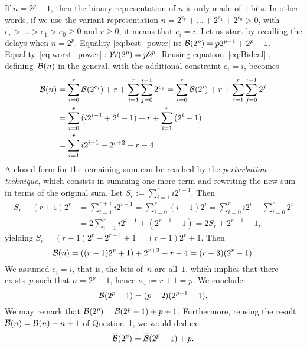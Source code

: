 If \(n=2^p-1\), then the binary representation of \(n\) is only made
of \(1\)\hyp{}bits. In other words, if we use the variant
representation \(n=2^{e_r} + \dots + 2^{e_1} + 2^{e_0} > 0\), with
\(e_r > \dots > e_1 > e_0 \geqslant 0\) and \({r \geqslant 0}\), it
means that \({e_i=i}\). Let us start by recalling the delays when
\({n=2^p}\). Equality \eqref{eq:best_power} 
is: \(\mathcal{B}(2^p) = p2^{p-1} + 2^p -
1\). Equality~\eqref{eq:worst_power} :
\(\mathcal{W}(2^p) = p2^p\). Reusing equation~\eqref{eq:Bideal}
, defining~\(\mathcal{B}(n)\) in the general, with the
additional constraint \({e_i=i}\), becomes
\begin{align*}
\mathcal{B}(n)
  &=   \sum_{i=0}^{r}{\mathcal{B}(2^{e_i})}
     + r + \sum_{i=1}^{r}\sum_{j=0}^{i-1}{2^{e_j}}
   = \sum_{i=0}^{r}{\mathcal{B}(2^i)}
     + r + \sum_{i=1}^{r}\sum_{j=0}^{i-1}{2^j}\\
  &= \sum_{i=0}^{r}{(i2^{i-1} + 2^i - 1)}
     + r + \sum_{i=1}^{r}{(2^i - 1)}\\
  &= \sum_{i=1}^{r}{i2^{i-1}} + 2^{r+2} - r - 4.
\end{align*}
A closed form for the remaining sum can be reached by the
\emph{perturbation technique}, which consists in summing one more term
and rewriting the new sum in terms of the original sum. Let \(S_{r} :=
\sum_{i=1}^{r}{i2^{i-1}}\). Then
\begin{align*}
S_{r} + (r+1)2^r
  &= \sum_{i=1}^{r+1}{i2^{i-1}} = \sum_{i=0}^{r}{(i+1)2^{i}}
   = \sum_{i=0}^{r}{i2^{i}} + \sum_{i=0}^{r}{2^{i}}\\
  &= 2\sum_{i=1}^{r}{i2^{i-1}} + (2^{r+1} - 1)
   = 2S_{r} + 2^{r+1} - 1,
\end{align*}
yielding \(S_{r} = (r+1)2^r - 2^{r+1} + 1 = (r-1)2^r + 1\). Then
\begin{equation*}
\mathcal{B}(n) = ((r-1)2^r + 1) + 2^{r+2} - r - 4
           = (r+3)(2^r - 1).
\end{equation*}
We assumed \({e_i=i}\), that is, the bits of~\(n\) are all~\(1\),
which implies that there exists~\(p\) such that \(n=2^p-1\), hence
\(\nu_n := r+1 = p\). We conclude:
\begin{equation*}
\mathcal{B}(2^p-1) = (p+2)(2^{p-1} -1).
\end{equation*}
We may remark that \(\mathcal{B}(2^p) = \mathcal{B}(2^p-1) + p + 1\).
Furthermore, reusing the result \(\overline{\mathcal{B}}(n) = \mathcal{B}(n) - n + 1\) of
Question~1, we would deduce
\begin{equation}
\overline{\mathcal{B}}(2^p) = \overline{\mathcal{B}}(2^p-1) + p.\label{eq:Bcomp}
\end{equation}
